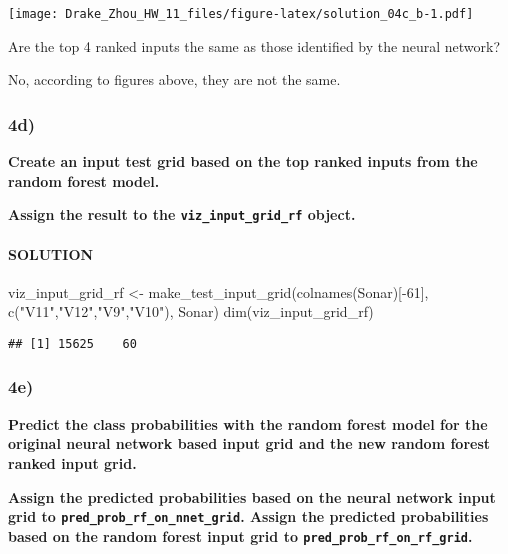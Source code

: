 \documentclass[
]{article}
\newenvironment{Shaded}{\begin{snugshade}}{\end{snugshade}}
\newcommand{\DecValTok}[1]{\textcolor[rgb]{0.00,0.00,0.81}{#1}}
\newcommand{\FunctionTok}[1]{\textcolor[rgb]{0.00,0.00,0.00}{#1}}
\newcommand{\NormalTok}[1]{#1}
\newcommand{\OtherTok}[1]{\textcolor[rgb]{0.56,0.35,0.01}{#1}}
\newcommand{\SpecialCharTok}[1]{\textcolor[rgb]{0.00,0.00,0.00}{#1}}
\newcommand{\StringTok}[1]{\textcolor[rgb]{0.31,0.60,0.02}{#1}}
\begin{document}
\texttt{[image: Drake\_Zhou\_HW\_11\_files/figure-latex/solution\_04c\_b-1.pdf]}

Are the top 4 ranked inputs the same as those identified by the neural
network?

No, according to figures above, they are not the same.

\hypertarget{d-3}{%
\subsubsection{4d)}\label{d-3}}

\textbf{Create an input test grid based on the top ranked inputs from
the random forest model.}

\textbf{Assign the result to the \texttt{viz\_input\_grid\_rf} object.}

\hypertarget{solution-20}{%
\paragraph{SOLUTION}\label{solution-20}}

\begin{Shaded}
\begin{Highlighting}[]
\NormalTok{viz\_input\_grid\_rf }\OtherTok{\textless{}{-}} \FunctionTok{make\_test\_input\_grid}\NormalTok{(}\FunctionTok{colnames}\NormalTok{(Sonar)[}\SpecialCharTok{{-}}\DecValTok{61}\NormalTok{],}
                                          \FunctionTok{c}\NormalTok{(}\StringTok{"V11"}\NormalTok{,}\StringTok{"V12"}\NormalTok{,}\StringTok{"V9"}\NormalTok{,}\StringTok{"V10"}\NormalTok{),}
\NormalTok{                                          Sonar)}
\FunctionTok{dim}\NormalTok{(viz\_input\_grid\_rf)}
\end{Highlighting}
\end{Shaded}

\begin{verbatim}
## [1] 15625    60
\end{verbatim}

\hypertarget{e-3}{%
\subsubsection{4e)}\label{e-3}}

\textbf{Predict the class probabilities with the random forest model for
the original neural network based input grid and the new random forest
ranked input grid.}

\textbf{Assign the predicted probabilities based on the neural network
input grid to \texttt{pred\_prob\_rf\_on\_nnet\_grid}. Assign the
predicted probabilities based on the random forest input grid to
\texttt{pred\_prob\_rf\_on\_rf\_grid}.}
\end{document}

